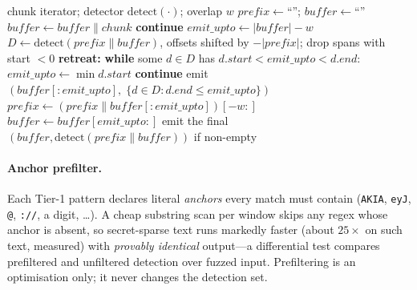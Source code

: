 \documentclass[runningheads]{llncs}
\newcommand{\Sw}{S_{w}}
\begin{document}
\begin{algorithm}[t]
\caption{Bounded-overlap streaming (sequential engine $\Sw$).}
\label{alg:stream}
\begin{algorithmic}[1]
\small
\Require chunk iterator; detector $\mathrm{detect}(\cdot)$; overlap $w$
\State $\mathit{prefix} \gets \text{``''}$; \quad $\mathit{buffer} \gets \text{``''}$
  \State $\mathit{buffer} \gets \mathit{buffer} \mathbin{\|} \mathit{chunk}$
   \textbf{continue} \EndIf
  \State $\mathit{emit\_upto} \gets |\mathit{buffer}| - w$
  \State $D \gets \mathrm{detect}(\mathit{prefix} \mathbin{\|} \mathit{buffer})$,
         offsets shifted by $-|\mathit{prefix}|$; drop spans with start $<0$
  \State \textbf{retreat:} \textbf{while} some $d\in D$ has
         $d.\mathit{start} < \mathit{emit\_upto} < d.\mathit{end}$:
         $\mathit{emit\_upto} \gets \min d.\mathit{start}$
   \textbf{continue} \EndIf
  \State emit $(\mathit{buffer}[{:}\mathit{emit\_upto}],\;
         \{d \in D : d.\mathit{end} \le \mathit{emit\_upto}\})$
  \State $\mathit{prefix} \gets (\mathit{prefix} \mathbin{\|}
         \mathit{buffer}[{:}\mathit{emit\_upto}])[-w{:}]$
  \State $\mathit{buffer} \gets \mathit{buffer}[\mathit{emit\_upto}{:}]$
\EndFor
\State emit the final $(\mathit{buffer}, \mathrm{detect}(\mathit{prefix}
       \mathbin{\|} \mathit{buffer}))$ if non-empty
\end{algorithmic}
\end{algorithm}

\paragraph{Anchor prefilter.}
Each Tier-1 pattern declares literal \emph{anchors} every match must contain
(\texttt{AKIA}, \texttt{eyJ}, \texttt{@}, \texttt{://}, a digit, \ldots). A cheap
substring scan per window skips any regex whose anchor is absent, so
secret-sparse text runs markedly faster (about $25\times$ on such text, measured)
with \emph{provably identical} output---a differential test compares prefiltered
and unfiltered detection over fuzzed input. Prefiltering is an optimisation only;
it never changes the detection set.
\end{document}

